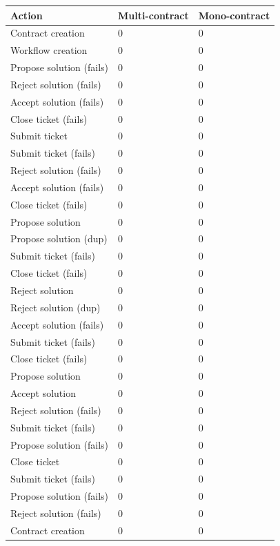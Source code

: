 \documentclass{article}
\begin{document}
		\begin{tabular}{| l | l | l |}
			\hline
			Action 						& Multi-contract & Mono-contract \\ \hline
			Contract creation 			& 0 & 0 \\\hline
			Workflow creation 			& 0 & 0 \\\hline
			Propose solution (fails) 	& 0 & 0 \\\hline
			Reject solution (fails) 	& 0 & 0 \\\hline
			Accept solution (fails) 	& 0 & 0 \\\hline
			Close ticket (fails) 		& 0 & 0 \\\hline
			Submit ticket	 			& 0 & 0 \\\hline
			Submit ticket (fails)		& 0 & 0 \\\hline
			Reject solution (fails) 	& 0 & 0 \\\hline
			Accept solution (fails) 	& 0 & 0 \\\hline
			Close ticket (fails) 		& 0 & 0 \\\hline
			Propose solution 		 	& 0 & 0 \\\hline
			Propose solution (dup)	 	& 0 & 0 \\\hline
			Submit ticket (fails)		& 0 & 0 \\\hline
			Close ticket (fails) 		& 0 & 0 \\\hline
			Reject solution 		 	& 0 & 0 \\\hline
			Reject solution (dup)	 	& 0 & 0 \\\hline
			Accept solution (fails) 	& 0 & 0 \\\hline
			Submit ticket (fails)		& 0 & 0 \\\hline
			Close ticket (fails) 		& 0 & 0 \\\hline
			Propose solution 		 	& 0 & 0 \\\hline
			Accept solution 		 	& 0 & 0 \\\hline
			Reject solution (fails)	 	& 0 & 0 \\\hline
			Submit ticket (fails)		& 0 & 0 \\\hline
			Propose solution (fails) 	& 0 & 0 \\\hline
			Close ticket 		 		& 0 & 0 \\\hline
			Submit ticket (fails)		& 0 & 0 \\\hline
			Propose solution (fails) 	& 0 & 0 \\\hline
			Reject solution (fails) 	& 0 & 0 \\\hline
			Contract creation 			& 0 & 0 \\
			\hline
		\end{tabular}
\end{document}
